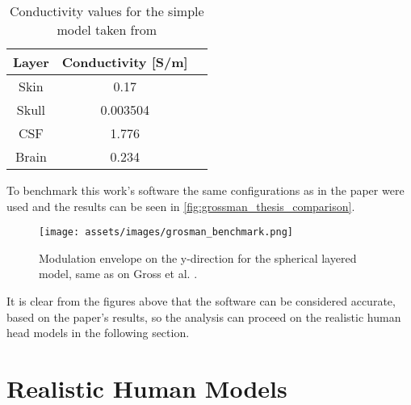 \begin{table}[!ht]
\centering
\caption{Conductivity values for the simple model taken from \cite{ITstissue}}
\label{tab:grossman_conductivity_vals}
\begin{tabular}{|c|c|c|}
    \hline
    \rowcolor[HTML]{C0C0C0} 
    {\color[HTML]{000000} \textbf{Layer}} & {\color[HTML]{000000} \textbf{Conductivity {[}S/m{]}}} \\ \hline
    Skin & 0.17 \\ \hline
    Skull & 0.003504 \\ \hline
    CSF & 1.776 \\ \hline
    Brain & 0.234 \\ \hline
\end{tabular}
\end{table}

To benchmark this work's software the same configurations as in the paper were used and the results can be seen in \autoref{fig:grossman_thesis_comparison}.

\begin{figure}[H]
    \centering
    \texttt{[image: assets/images/grosman\_benchmark.png]}
    \caption[Modulation envelope on the y-direction for the spherical layered model]{Modulation envelope on the y-direction for the spherical layered model, same as on Gross et al. \cite[Figure 2B]{Grossman2017}.}
    \label{fig:grossman_thesis_comparison}
\end{figure}

It is clear from the figures above that the software can be considered accurate, based on the paper's results, so the analysis can proceed on the realistic human head models in the following section.


\section{Realistic Human Models}
\label{sec:realistic_human_models}


